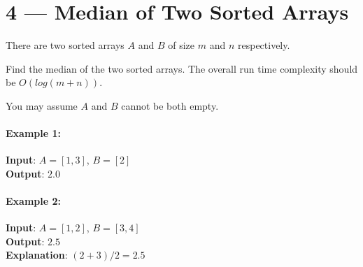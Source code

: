 \section{4 --- Median of Two Sorted Arrays}
There are two sorted arrays $A$ and $B$ of size $m$ and $n$ respectively.
\par
Find the median of the two sorted arrays. The overall run time complexity should be $O(log (m+n))$.
\par
You may assume $A$ and $B$ cannot be both empty.

\paragraph{Example 1:}
\begin{flushleft}
\textbf{Input}: $A = [1, 3]$, $B = [2]$
\\
\textbf{Output}: $2.0$
\end{flushleft}

\paragraph{Example 2:}
\begin{flushleft}
\textbf{Input}: $A = [1, 2]$, $B = [3, 4]$
\\
\textbf{Output}: $2.5$ 
\\
\textbf{Explanation}: $(2 + 3)/2 = 2.5$
\end{flushleft}
